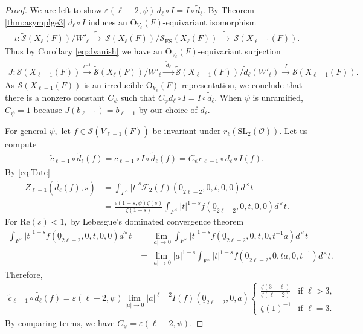 \documentclass[11pt,a4paper,reqno]{amsart}
\theoremstyle{remark}
\numberwithin{equation}{section}
\newcommand{\SL}{\mathrm{SL}}
\newcommand{\lto}{\,\longrightarrow\,}
\theoremstyle{definition}
\numberwithin{equation}{section}
\begin{document}
\begin{proof}
We are left to show $\varepsilon(\ell-2,\psi)\, d_\ell\circ I=I\circ \tilde{d}_\ell$. By Theorem \ref{thm:asymplge3}
$d_{\ell}\circ I$ induces an $\mathrm{O}_{V_\ell}(F)$-equivariant isomorphism 
\begin{align*} 
 \iota:\widetilde{\mathcal{S}}(X_\ell(F))/W'_\ell   \tilde{\lto} \mathcal{S}(X_\ell(F))/\mathcal{S}_{\mathrm{ES}}(X_\ell(F))\tilde{\lto}\mathcal{S}(X_{\ell-1}(F)).
\end{align*}
Thus by Corollary \ref{eq:dvanish} we have an $\mathrm{O}_{V_\ell}(F)$-equivariant surjection
\begin{align*}
    J:\mathcal{S}(X_{\ell-1}(F))\xrightarrow{\iota^{-1}} \widetilde{\mathcal{S}}(X_\ell(F))/W'_\ell \xrightarrow{\,\,\tilde{d}_\ell\,\,}  \widetilde{\mathcal{S}}(X_{\ell-1}(F))/\tilde{d}_\ell(W'_\ell)\xrightarrow{\,\,I\,\,}  \mathcal{S}(X_{\ell-1}(F)).
\end{align*}
 As $\mathcal{S}(X_{\ell-1}(F))$ is an irreducible $\mathrm{O}_{V_\ell}(F)$-representation, we conclude that there is a nonzero constant $C_\psi$ such that $C_\psi d_\ell\circ I=I\circ \tilde{d}_\ell.$ When $\psi$ is unramified, $C_\psi=1$ because $J(b_{\ell-1})=b_{\ell-1}$ by our choice of $d_\ell$.

For general $\psi,$ let $f\in  \mathcal{S}(V_{\ell+1}(F))$ be invariant under $r_\ell(\SL_2(\mathcal{O})).$ Let us compute
\begin{align*}
    \tilde{c}_{\ell-1}\circ \tilde{d_\ell}(f)=c_{\ell-1}\circ I\circ \tilde{d}_\ell(f)=C_\psi c_{\ell-1}\circ d_\ell\circ I(f).
\end{align*}
By \eqref{eq:Tate}
\begin{align*}
    Z_{\ell-1}(\tilde{d_\ell}(f),s)&=\int_{F^\times} |t|^s\mathcal{F}_2(f)(\underline{0}_{2\ell-2},0,t,0,0) d^\times t\\
    &=\frac{\epsilon(1-s,\psi)\zeta(s)}{\zeta(1-s)}\int_{F^\times} |t|^{1-s} f(\underline{0}_{2\ell-2},0,t,0,0)d^\times t.
\end{align*}
For $\mathrm{Re}(s)<1,$ by Lebesgue's dominated convergence theorem  
\begin{align*}
    \int_{F^\times} |t|^{1-s} f(\underline{0}_{2\ell-2},0,t,0,0)d^\times t&=\lim_{|a|\to 0}\int_{F^\times} |t|^{1-s} f(\underline{0}_{2\ell-2},0,t,0,t^{-1}a)d^\times t\\
    &=\lim_{|a|\to 0} |a|^{1-s}\int_{F^\times} |t|^{1-s} f(\underline{0}_{2\ell-2},0,ta,0,t^{-1})d^\times t.
\end{align*}
Therefore,
\begin{align*}
    \tilde{c}_{\ell-1}\circ \tilde{d_\ell}(f)=\varepsilon(\ell-2,\psi)\lim_{|a|\to 0} |a|^{\ell-2}I(f)(\underline{0}_{2\ell-2},0,a)\begin{cases}
        \frac{\zeta(3-\ell)}{\zeta(\ell-2)}  & \textrm{if } \ell>3,\\
        \zeta(1)^{-1} & \textrm{if }\ell=3.
    \end{cases}
\end{align*}
By comparing terms, we have $C_\psi=\varepsilon(\ell-2,\psi).$ 
\end{proof}
\end{document}
